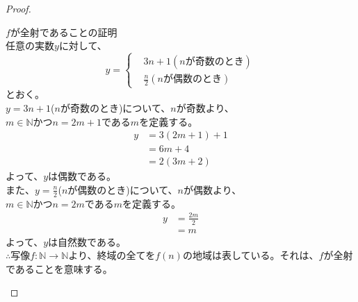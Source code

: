\documentclass[dvipdfmx,uplatex]{jsarticle}
\begin{document}
  \begin{proof}
    \begin{flushleft}
        $f$が全射であることの証明\\
        任意の実数$y$に対して、
        \begin{equation}
          y = 
          \left \{
              \begin{aligned}
                  &3n + 1 (nが奇数のとき)\\
                  &\frac{n}{2} (nが偶数のとき)
              \end{aligned}
          \right. \nonumber
        \end{equation}
        とおく。\\
        $y=3n+1$($n$が奇数のとき)について、$n$が奇数より、\\
        $m\in\mathbb{N}$かつ$n=2m+1$である$m$を定義する。\\
        \begin{equation}
          \begin{aligned}
            y &= 3(2m+1)+1\nonumber\\
            &= 6m+4\nonumber\\
            &= 2(3m+2)\nonumber
          \end{aligned}
        \end{equation}
        よって、$y$は偶数である。\\
        また、$y=\frac{n}{2}$($n$が偶数のとき)について、$n$が偶数より、\\
        $m\in\mathbb{N}$かつ$n=2m$である$m$を定義する。\\
        \begin{equation}
          \begin{aligned}
            y &= \frac{2m}{2}\nonumber\\
            &= m\nonumber
          \end{aligned}
        \end{equation}
        よって、$y$は自然数である。\\
        $\therefore 写像f:\mathbb{N}\longrightarrow\mathbb{N}$より、終域の全てを$f(n)$の地域は表している。それは、$f$が全射であることを意味する。
    \end{flushleft}
\end{proof}
\end{document}
